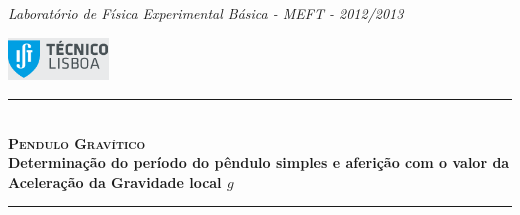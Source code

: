 \documentclass[a4paper,12pt]{article}      %
\author{Prof. Bernardo B. Carvalho}
\date{ Setembro 2012}
\newcommand{\HRule}{\rule{\linewidth}{0.5mm}}
\begin{document}
 
\thispagestyle{empty}
{\small\it Laboratório de Física Experimental Básica - MEFT - 2012/2013}

\includegraphics[width=0.2\textwidth]{../logo-ist}%
	
	\HRule \\[0.5cm]
	{ \huge   \bfseries \textsc{ Pendulo Gravítico } }\\[0.4cm]
	{ \large \bfseries Determinação do período do pêndulo simples e aferição com o valor da Aceleração da Gravidade local $g$  }\\
	\HRule \\%
	
%	 

\end{document}
